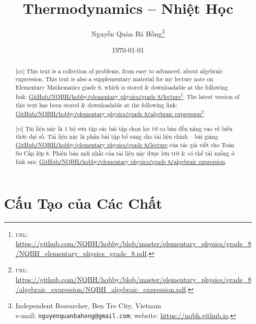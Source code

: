 \documentclass{article}
\title{Thermodynamics -- Nhiệt Học}
\author{Nguyễn Quản Bá Hồng\footnote{Independent Researcher, Ben Tre City, Vietnam\\e-mail: \texttt{nguyenquanbahong@gmail.com}; website: \url{https://nqbh.github.io}.}}
\date{\today}
\numberwithin{equation}{section}
\begin{document}
\maketitle
\begin{abstract}
	\textsc{[en]} This text is a collection of problems, from easy to advanced, about algebraic expression. This text is also a supplementary material for my lecture note on Elementary Mathematics grade 8, which is stored \& downloadable at the following link: \href{https://github.com/NQBH/hobby/blob/master/elementary_physics/grade_8/NQBH_elementary_physics_grade_8.pdf}{GitHub\texttt{/}NQBH\texttt{/}hobby\texttt{/}elementary physics\texttt{/}grade 8\texttt{/}lecture}\footnote{\textsc{url}: \url{https://github.com/NQBH/hobby/blob/master/elementary_physics/grade_8/NQBH_elementary_physics_grade_8.pdf}.}. The latest version of this text has been stored \& downloadable at the following link: \href{https://github.com/NQBH/hobby/blob/master/elementary_physics/grade_8/algebraic_expression/NQBH_algebraic_expression.pdf}{GitHub\texttt{/}NQBH\texttt{/}hobby\texttt{/}elementary physics\texttt{/}grade 8\texttt{/}algebraic expression}\footnote{\textsc{url}: \url{https://github.com/NQBH/hobby/blob/master/elementary_physics/grade_8/algebraic_expression/NQBH_algebraic_expression.pdf}.}.
	\vspace{2mm}
	
	\textsc{[vi]} Tài liệu này là 1 bộ sưu tập các bài tập chọn lọc từ cơ bản đến nâng cao về biểu thức đại số. Tài liệu này là phần bài tập bổ sung cho tài liệu chính -- bài giảng \href{https://github.com/NQBH/hobby/blob/master/elementary_physics/grade_8/NQBH_elementary_physics_grade_8.pdf}{GitHub\texttt{/}NQBH\texttt{/}hobby\texttt{/}elementary physics\texttt{/}grade 8\texttt{/}lecture} của tác giả viết cho Toán Sơ Cấp lớp 8. Phiên bản mới nhất của tài liệu này được lưu trữ \& có thể tải xuống ở link sau: \href{https://github.com/NQBH/hobby/blob/master/elementary_physics/grade_8/algebraic_expression/NQBH_algebraic_expression.pdf}{GitHub\texttt{/}NQBH\texttt{/}hobby\texttt{/}elementary physics\texttt{/}grade 8\texttt{/}algebraic expression}.
\end{abstract}
\tableofcontents
\newpage


\section{Cấu Tạo của Các Chất}
\end{document}
